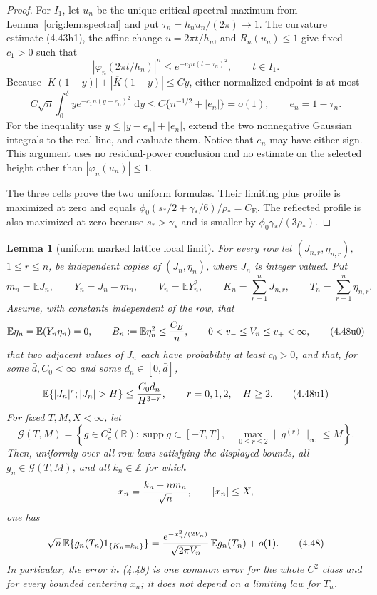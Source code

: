 \documentclass[11pt,a4paper]{article}
\numberwithin{equation}{section}
\newtheorem{lemma}[theorem]{Lemma}
\theoremstyle{definition}
\theoremstyle{remark}
\newcommand{\E}{\mathbb E}
\newcommand{\dd}{\,\mathrm d}
\newcommand{\CE}{C_{\mathrm E}}
\begin{document}
\begin{proof}
For $I_1$, let $u_n$ be the unique critical spectral maximum from
Lemma~\ref{orig:lem:spectral} and put
$\tau_n=h_nu_n/(2\pi)\to1$.  The curvature estimate (4.43h1), the affine
change $u=2\pi t/h_n$, and $R_n(u_n)\le1$ give fixed $c_1>0$ such that
\[
 |\varphi_n(2\pi t/h_n)|^n
 \le e^{-c_1n(t-\tau_n)^2},\qquad t\in I_1.           \tag{4.43q1}
\]
Because $|K(1-y)|+|\overline K(1-y)|\le Cy$, either normalized endpoint
is at most
\[
 C\sqrt n\int_0^\delta y e^{-c_1n(y-e_n)^2}\,\dd y
 \le C\{n^{-1/2}+|e_n|\}=o(1),\qquad e_n=1-\tau_n.   \tag{4.43q}
\]
For the inequality use $y\le|y-e_n|+|e_n|$, extend the two nonnegative
Gaussian integrals to the real line, and evaluate them.  Notice that
$e_n$ may have either sign.  This argument uses no residual-power
conclusion and no estimate on the selected height other than
$|\varphi_n(u_n)|\le1$.

The three cells prove the two uniform formulas.  Their limiting plus
profile is maximized at zero and equals
$\phi_0(s_*/2+\gamma_*/6)/\rho_*=\CE$.  The reflected profile is also
maximized at zero because $s_*>\gamma_*$ and is smaller by
$\phi_0\gamma_*/(3\rho_*)$.
\end{proof}

\begin{lemma}[uniform marked lattice local limit]\label{orig:lem:markedllt-full}
For every row let $(J_{n,r},\eta_{n,r})$, $1\le r\le n$, be independent
copies of $(J_n,\eta_n)$, where $J_n$ is integer valued.  Put
\[
 m_n=\E J_n,\qquad Y_n=J_n-m_n,\qquad V_n=\E Y_n^2,
 \qquad K_n=\sum_{r=1}^nJ_{n,r},\qquad
 T_n=\sum_{r=1}^n\eta_{n,r}.
\]
Assume, with constants independent of the row, that
\[
 \E\eta_n=\E(Y_n\eta_n)=0,\qquad
 B_n:=\E\eta_n^2\le {C_B\over n},
 \qquad 0<v_-\le V_n\le v_+<\infty,                 \tag{4.48u0}
\]
that two adjacent values of $J_n$ each have probability at least $c_0>0$,
and that, for some $\bar d,C_0<\infty$ and some $d_n\in[0,\bar d]$,
\[
 \E\{|J_n|^r;|J_n|>H\}\le {C_0d_n\over H^{3-r}},
 \qquad r=0,1,2,\quad H\ge2.                         \tag{4.48u1}
\]
For fixed $T,M,X<\infty$, let
\[
 \mathscr G(T,M)=\left\{g\in C_c^2(\mathbb R):
 \operatorname {supp}g\subset[-T,T],\quad
 \max_{0\le r\le2}\|g^{(r)}\|_\infty\le M\right\}.
\]
Then, uniformly over all row laws satisfying the displayed bounds, all
$g_n\in\mathscr G(T,M)$, and all $k_n\in\mathbb Z$ for which
\[
 x_n={k_n-nm_n\over\sqrt n},\qquad |x_n|\le X,
\]
one has
\[
 \sqrt n\,\E\{g_n(T_n)1_{\{K_n=k_n\}}\}
 ={e^{-x_n^2/(2V_n)}\over\sqrt{2\pi V_n}}\,
      \E g_n(T_n)+o(1).                              \tag{4.48}
\]
In particular, the error in \emph{(4.48)} is one common error for the
whole $C^2$ class and for every bounded centering $x_n$; it does not depend
on a limiting law for $T_n$.
\end{lemma}
\end{document}
